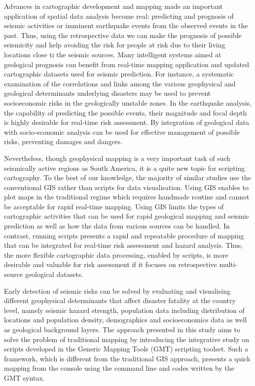 \documentclass[sustainability,article,submit,pdftex,moreauthors]{Definitions/mdpi}
\begin{document}
Advances in cartographic development and mapping made an important application of spatial data analysis become real: predicting and prognosis of seismic activities or imminent earthquake events from the observed events in the past. Thus, using the retrospective data we can make the prognosis of possible seismicity and help avoiding the risk for people at risk due to their living locations close ti the seismic sources. Many intelligent systems aimed at geological prognosis can benefit from real-time mapping application and updated cartographic datasets used for seismic prediction. For instance, a systematic examination of the correlations and links among the various geophysical and geological determinants underlying disasters may be used to prevent socioeconomic risks in the geologically unstable zones. In the earthquake analysis, the capability of predicting the possible events, their magnitude and focal depth is highly desirable for real-time risk assessment. By integration of geological data with socio-economic analysis can be used for effective management of possible risks, preventing damages and dangers. 

Nevertheless, though geophysical mapping is a very important task of such seismically active regions as South America, it is a quite new topic for scripting cartography. To the best of our knowledge, the majority of similar studies use the conventional GIS rather than scripts for data visualisation. Using GIS enables to plot maps in the traditional regime which requires handmade routine and cannot be acceptable for rapid real-time mapping. Using GIS limits the types of cartographic activities that can be used for rapid geological mapping and seismic prediction as well as how the data from various sources can be handled.  In contrast, running scripts presents a rapid and repeatable procedure of mapping that can be integrated for real-time risk assessment and hazard analysis. Thus, the more flexible cartographic data processing, enabled by scripts, is more desirable and valuable for risk assessment if it focuses on retrospective multi-source geological datasets. 

Early detection of seismic risks can be solved by evaluating and visualising different geophysical determinants that affect disaster fatality at the country level, namely seismic hazard strength, population data including distribution of locations and population density, demographics and socioeconomics data as well as geological background layers. The approach presented in this study aims to solve the problem of traditional mapping by introducing the integrative study on scripts developed in the Generic Mapping Tools (GMT) scripting toolset. Such a framework, which is different from the traditional GIS approach, presents a quick mapping from the console using the command line and codes written by the GMT syntax. 
\end{document}
